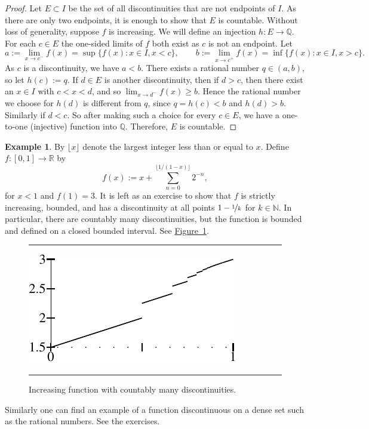 \documentclass[12pt]{book}
\newenvironment{myfigureht}{%
\begin{figure}[h!t]
\noindent\rule{\textwidth}{0.4pt}\vspace{12pt}\par\centering}%
{\par\noindent\rule{\textwidth}{0.4pt}
\end{figure}}
\newcommand{\R}{{\mathbb{R}}}
\newcommand{\N}{{\mathbb{N}}}
\newcommand{\Q}{{\mathbb{Q}}}
\theoremstyle{plain}
\theoremstyle{remark}
\theoremstyle{definition}
\theoremstyle{exercise}
\theoremstyle{example}
\newtheorem{example}[thm]{Example}
\newcommand{\figureref}[1]{\hyperref[#1]{Figure~\ref*{#1}}}
\begin{document}
\begin{proof}
Let $E \subset I$ be the set of all discontinuities
that are not endpoints of $I$.  As there are
only two endpoints, it is enough to show that $E$ is countable.
Without loss of generality, suppose $f$ is increasing.
We will define an injection $h \colon E \to \Q$.
For each $c \in E$
the one-sided limits of $f$ both exist as $c$ is not an endpoint.
Let
\begin{equation*}
a := \lim_{x \to c^-} f(x) = \sup \{ f(x) : x \in I, x < c \} ,
\qquad
b := \lim_{x \to c^+} f(x) = \inf \{ f(x) : x \in I, x > c \} .
\end{equation*}
As $c$ is a discontinuity, we have $a < b$.  
There exists a rational number $q \in (a,b)$, so let $h(c) := q$.
If $d \in E$ is another discontinuity, then if $d > c$, then there
exist an $x \in I$ with $c < x < d$, and so $\lim_{x \to d^-} f(x) \geq b$.
Hence the rational number we choose for $h(d)$ is different from $q$,
since $q=h(c) < b$ and $h(d) > b$.
Similarly if $d < c$.  So after making such a choice for
every $c \in E$, we have a 
one-to-one (injective) function into $\Q$.  Therefore, $E$ is countable.
\end{proof}

\begin{example} \label{example:countdiscont}
By $\lfloor x \rfloor$ denote the largest integer less than or equal to $x$.
Define $f \colon [0,1] \to \R$ by
\begin{equation*}
f(x) :=
x +
\sum_{n=0}^{\lfloor 1/(1-x) \rfloor}
2^{-n} ,
\end{equation*}
for $x < 1$ and $f(1) = 3$.
It is left as an exercise to show that $f$ is strictly increasing, bounded, and
has a discontinuity at all points $1-\nicefrac{1}{k}$ for $k \in \N$.  In particular,
there are countably many discontinuities, but the function is bounded and
defined on a closed bounded interval.  See \figureref{fig:countdiscont}.
\begin{myfigureht}
\includegraphics{figures/increasing-discont-fig}
\caption{Increasing function with countably many
discontinuities.\label{fig:countdiscont}}
\end{myfigureht}

Similarly one can find an example of a function discontinuous on a dense set
such as the rational numbers.  See the exercises.
\end{example}
\end{document}
